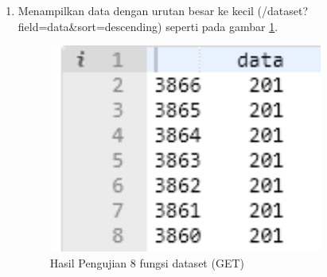 \begin{enumerate}
\item Menampilkan data dengan urutan besar ke kecil (/dataset?field=data\&sort=descending) seperti pada gambar \ref{fig:hujifd8}.
\begin{figure}[!htbp]
	\centerline{\includegraphics[width=0.85\textwidth]{figures/10/hujifd8.PNG}}
	\caption{Hasil Pengujian 8 fungsi dataset (GET)}
	\label{fig:hujifd8}
\end{figure}
\end{enumerate}

